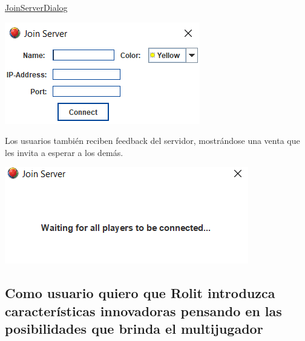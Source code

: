 \documentclass[../DocumentoOficial.tex]{subfiles}
\begin{document}
\underline{JoinServerDialog}
\begin{center}
\includegraphics[scale=1]{join-server-sprint-6.png}
\end{center}

Los usuarios también reciben feedback del servidor, mostrándose una venta que les invita a esperar a los demás.

\begin{center}
\includegraphics[scale=0.85]{user-feedback.png}
\end{center}

\newpage

\subsection{Como usuario quiero que Rolit introduzca características innovadoras pensando en las posibilidades que brinda el multijugador}
\end{document}
